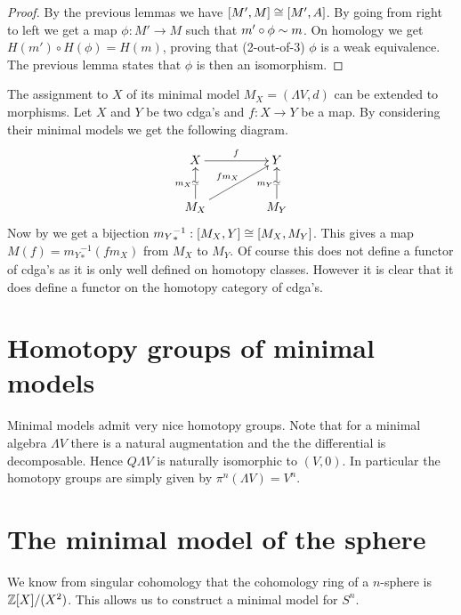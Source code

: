 \begin{proof}
	By the previous lemmas we have $[M', M] \cong [M', A]$. By going from right to left we get a map $\phi: M' \to M$ such that $m' \circ \phi \sim m$. On homology we get $H(m') \circ H(\phi) = H(m)$, proving that (2-out-of-3) $\phi$ is a weak equivalence. The previous lemma states that $\phi$ is then an isomorphism.
\end{proof}

The assignment to $X$ of its minimal model $M_X = (\Lambda V, d)$ can be extended to morphisms. Let $X$ and $Y$ be two cdga's and $f: X \to Y$ be a map. By considering their minimal models we get the following diagram.
\begin{displaymath}
	\xymatrix @C=1.5cm{
	X \ar[r]^f & Y \\
	M_X \arwe[u]^{m_X} \ar[ur]^{f m_X} & M_Y \arwe[u]^{m_Y}
	}
\end{displaymath}
Now by  we get a bijection ${m_Y}_\ast^{-1} : [M_X, Y] \cong [M_X, M_Y]$. This gives a map $M(f) = {m_Y}_\ast^{-1} (f m_X)$ from $M_X$ to $M_Y$. Of course this does not define a functor of cdga's as it is only well defined on homotopy classes. However it is clear that it does define a functor on the homotopy category of cdga's.



\section{Homotopy groups of minimal models}
Minimal models admit very nice homotopy groups. Note that for a minimal algebra $\Lambda V$ there is a natural augmentation and the the differential is decomposable. Hence $Q \Lambda V$ is naturally isomorphic to $(V, 0)$. In particular the homotopy groups are simply given by $\pi^n(\Lambda V) = V^n$.


\section{The minimal model of the sphere}
We know from singular cohomology that the cohomology ring of a $n$-sphere is $\mathbb{Z}[X] / (X^2)$. This allows us to construct a minimal model for $S^n$.

